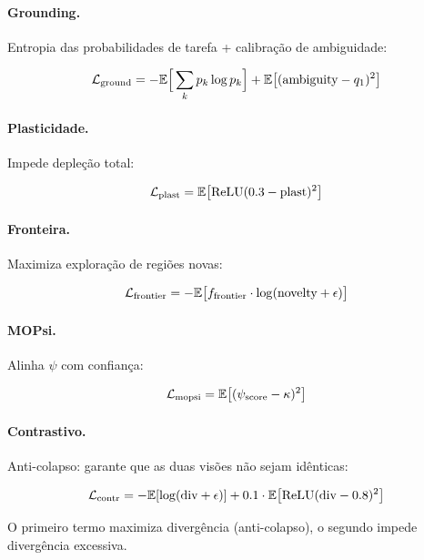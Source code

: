 \paragraph{Grounding.}
Entropia das probabilidades de tarefa + calibra\c{c}\~ao de ambiguidade:

\begin{equation}
    \mathcal{L}_{\text{ground}} = -\mathbb{E}\Big[\sum_k p_k \log p_k\Big] + \mathbb{E}\big[(\text{ambiguity} - q_1)^2\big]
\end{equation}

\paragraph{Plasticidade.}
Impede deple\c{c}\~ao total:

\begin{equation}
    \mathcal{L}_{\text{plast}} = \mathbb{E}\big[\text{ReLU}(0.3 - \text{plast})^2\big]
\end{equation}

\paragraph{Fronteira.}
Maximiza explora\c{c}\~ao de regi\~oes novas:

\begin{equation}
    \mathcal{L}_{\text{frontier}} = -\mathbb{E}\big[f_{\text{frontier}} \cdot \log(\text{novelty} + \epsilon)\big]
\end{equation}

\paragraph{MOPsi.}
Alinha $\psi$ com confian\c{c}a:

\begin{equation}
    \mathcal{L}_{\text{mopsi}} = \mathbb{E}\big[(\psi_{\text{score}} - \kappa)^2\big]
\end{equation}

\paragraph{Contrastivo.}
Anti-colapso: garante que as duas vis\~oes n\~ao sejam id\^enticas:

\begin{equation}
    \mathcal{L}_{\text{contr}} = -\mathbb{E}[\log(\text{div} + \epsilon)] + 0.1 \cdot \mathbb{E}\big[\text{ReLU}(\text{div} - 0.8)^2\big]
\end{equation}

O primeiro termo maximiza diverg\^encia (anti-colapso), o segundo
impede diverg\^encia excessiva.

